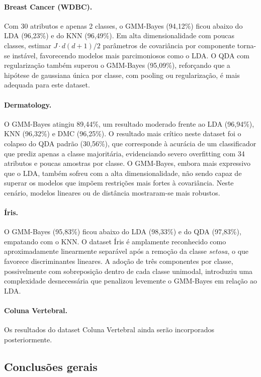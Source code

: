 \paragraph{Breast Cancer (WDBC).}
Com 30 atributos e apenas 2 classes, o GMM-Bayes (94,12\%) ficou abaixo do LDA (96,23\%)
e do KNN (96,49\%). Em alta dimensionalidade com poucas classes, estimar $J \cdot d(d+1)/2$
parâmetros de covariância por componente torna-se instável, favorecendo modelos mais
parcimoniosos como o LDA. O QDA com regularização também superou o GMM-Bayes (95,09\%),
reforçando que a hipótese de gaussiana única por classe, com pooling ou regularização, é mais
adequada para este dataset.

\paragraph{Dermatology.}
O GMM-Bayes atingiu 89,44\%, um resultado moderado frente ao LDA (96,94\%), KNN (96,32\%)
e DMC (96,25\%). O resultado mais crítico neste dataset foi o colapso do QDA padrão (30,56\%),
que corresponde à acurácia de um classificador que prediz apenas a classe majoritária,
evidenciando severo overfitting com 34 atributos e poucas amostras por classe. O GMM-Bayes,
embora mais expressivo que o LDA, também sofreu com a alta dimensionalidade, não sendo capaz
de superar os modelos que impõem restrições mais fortes à covariância. Neste cenário, modelos
lineares ou de distância mostraram-se mais robustos.

\paragraph{Íris.}
O GMM-Bayes (95,83\%) ficou abaixo do LDA (98,33\%) e do QDA (97,83\%), empatando com
o KNN. O dataset Íris é amplamente reconhecido como aproximadamente linearmente separável
após a remoção da classe \textit{setosa}, o que favorece discriminantes lineares. A adoção de
três componentes por classe, possivelmente com sobreposição dentro de cada classe unimodal,
introduziu uma complexidade desnecessária que penalizou levemente o GMM-Bayes em relação
ao LDA.

\paragraph{Coluna Vertebral.}
Os resultados do dataset Coluna Vertebral ainda serão incorporados posteriormente.

\subsection*{Conclusões gerais}

